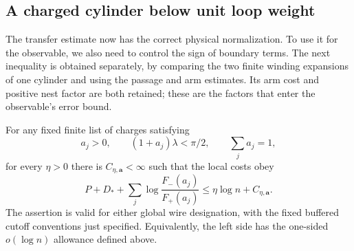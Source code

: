 \subsection{A charged cylinder below unit loop weight}

The transfer estimate now has the correct physical normalization.
To use it for the observable, we also need to control the sign of
boundary terms. The next inequality is obtained separately, by comparing
the two finite winding expansions of one cylinder and using the passage
and arm estimates. Its arm cost and positive nest factor are both
retained; these are the factors that enter the observable's error bound.

\begin{theorem}\label{thm:charge-budget}
For any fixed finite list of charges satisfying
\[
 a_j>0,\qquad (1+a_j)\lambda<\pi/2,\qquad \sum_j a_j=1,
\]
for every \(\eta>0\) there is \(C_{\eta,\mathbf a}<\infty\) such that the
local costs obey
\begin{equation}\label{physical:charge-budget}
 P+D_*+\sum_j\log\frac{F_-(a_j)}{F_+(a_j)}
 \le \eta\log n+C_{\eta,\mathbf a}.
\end{equation}
The assertion is valid for either global wire designation, with
the fixed buffered cutoff conventions just specified.  Equivalently,
the left side has the one-sided \(o(\log n)\) allowance defined above.
\end{theorem}


